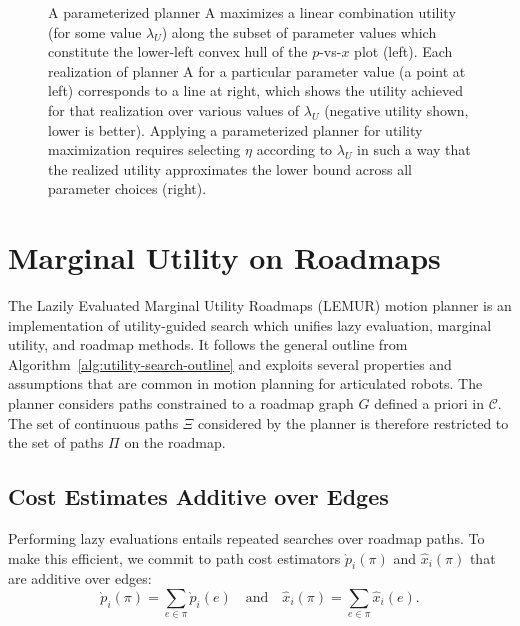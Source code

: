 \begin{figure}
   \centering
   \quad%
   \caption{A parameterized planner A maximizes a linear combination
      utility (for some value $\lambda_U$)
      along the subset of parameter values which
      constitute the lower-left convex hull of the $p$-vs-$x$ plot (left).
      Each realization of planner A for a particular parameter value
      (a point at left) corresponds to a line at right,
      which shows the utility achieved for that realization
      over various values of $\lambda_U$
      (negative utility shown, lower is better).
      Applying a parameterized planner for utility maximization
      requires selecting $\eta$ according to $\lambda_U$
      in such a way that the realized utility approximates
      the lower bound across all parameter choices (right).}
   \label{fig:convex}
\end{figure}

\section{Marginal Utility on Roadmaps}
\label{sec:roadmaps}

The Lazily Evaluated Marginal Utility Roadmaps (LEMUR) motion planner
is an implementation of utility-guided search which unifies
lazy evaluation, marginal utility, and roadmap methods.
It follows the general outline from
Algorithm~\ref{alg:utility-search-outline}
and exploits several properties and assumptions that are
common in motion planning for articulated robots.
The planner considers paths constrained to a roadmap graph $G$
defined a priori in $\mathcal{C}$.
The set of continuous paths $\Xi$ considered by the planner is
therefore restricted to the set of paths $\Pi$ on the roadmap.


\subsection{Cost Estimates Additive over Edges}

Performing lazy evaluations entails repeated searches over
roadmap paths.
To make this efficient,
we commit to path cost estimators
$\grave{p}_i(\pi)$ and $\hat{x}_i(\pi)$
that are additive over edges:
\begin{equation}
   \grave{p}_i(\pi) = \sum_{e \in \pi} \grave{p}_i(e)
   \quad\mbox{and}\quad
   \hat{x}_i(\pi) = \sum_{e \in \pi} \hat{x}_i(e).
\end{equation}

